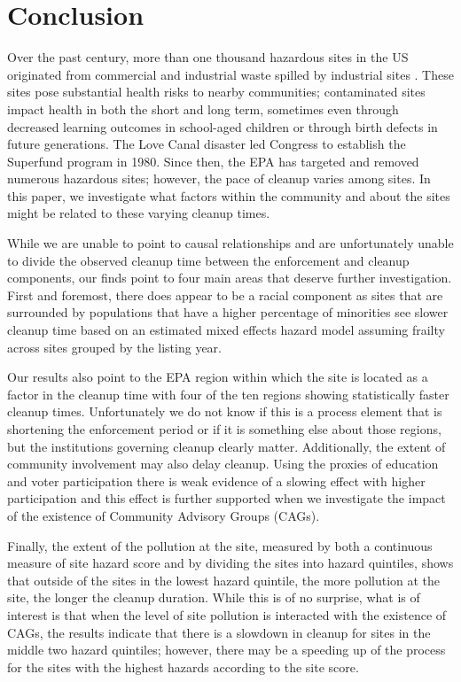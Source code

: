 \documentclass[12pt]{article}
\begin{document}
{\section{Conclusion}\label{conc}

Over the past century, more than one thousand hazardous sites in the US originated from commercial and industrial waste spilled by industrial sites \parencite{EPA2011}. These sites pose substantial health risks to nearby communities; contaminated sites impact health in both the short and long term, sometimes even through decreased learning outcomes in school-aged children \parencite{Pastor2004} or through birth defects in future generations. The Love Canal disaster led Congress to establish the Superfund program in 1980. Since then, the EPA has targeted and removed numerous hazardous sites; however, the pace of cleanup varies among sites. In this paper, we investigate what factors within the community and about the sites might be related to these varying cleanup times. 

While we are unable to point to causal relationships and are unfortunately unable to divide the observed cleanup time between the enforcement and cleanup components, our finds point to four main areas that deserve further investigation. First and foremost, there does appear to be a racial component as sites that are surrounded by populations that have a higher percentage of minorities see slower cleanup time based on an estimated mixed effects hazard model assuming frailty across sites grouped by the listing year. 

Our results also point to the EPA region within which the site is located as a factor in the cleanup time with four of the ten regions showing statistically faster cleanup times. Unfortunately we do not know if this is a process element that is shortening the enforcement period or if it is something else about those regions, but the institutions governing cleanup clearly matter. Additionally, the extent of community involvement may also delay cleanup. Using the proxies of education and voter participation there is weak evidence of a slowing effect with higher participation and this effect is further supported when we investigate the impact of the existence of Community Advisory Groups (CAGs).

Finally, the extent of the pollution at the site, measured by both a continuous measure of site hazard score and by dividing the sites into hazard quintiles, shows that outside of the sites in the lowest hazard quintile, the more pollution at the site, the longer the cleanup duration. While this is of no surprise, what is of interest is that when the level of site pollution is interacted with the existence of CAGs, the results indicate that there is a slowdown in cleanup for sites in the middle two hazard quintiles; however, there may be a speeding up of the process for the sites with the highest hazards according to the site score. 

}
\end{document}
